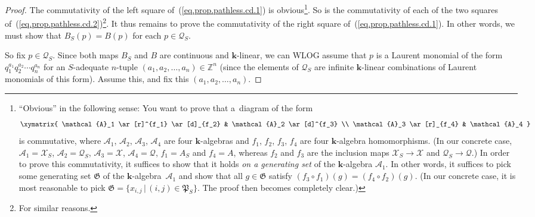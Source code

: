 \documentclass[pdftex]{sigma}
\numberwithin{equation}{section}
\begin{document}
\begin{proof}The commutativity of the left square of~(\ref{eq.prop.pathless.cd.1}) is obvious\footnote{``Obvious'' in the following sense: You want to prove that a~diagram of the form
\begin{gather*}
\xymatrix{
\mathcal{A}_1 \ar[r]^{f_1} \ar[d]_{f_2} & \mathcal{A}_2 \ar[d]^{f_3} \\
\mathcal{A}_3 \ar[r]_{f_4} & \mathcal{A}_4
}
\end{gather*}
is commutative, where $\mathcal{A}_{1}$, $\mathcal{A}_{2}$, $\mathcal{A}_{3}$, $\mathcal{A}_{4}$ are four $\mathbf{k}$-algebras and $f_{1}$, $f_{2}$, $f_{3}$, $f_{4}$ are four $\mathbf{k}$-algebra homomorphisms. (In our concrete case, $\mathcal{A}_{1}=\mathcal{X}_{S}$, $\mathcal{A}_{2}=\mathcal{Q}_{S}$, $\mathcal{A}_{3}=\mathcal{X}$, $\mathcal{A}_{4}=\mathcal{Q}$, $f_{1}=A_{S}$ and $f_{4}=A$, whereas $f_{2}$ and $f_{3}$ are the inclusion maps $\mathcal{X}_{S}\rightarrow\mathcal{X}$ and $\mathcal{Q}_{S}\rightarrow \mathcal{Q}$.) In order to prove this commutativity, it suffices to show that it holds \textit{on a generating set} of the $\mathbf{k}$-algebra
$\mathcal{A}_{1}$. In other words, it suffices to pick some generating set $\mathfrak{G}$ of the $\mathbf{k}$-algebra~$\mathcal{A}_{1}$ and show that all $g\in\mathfrak{G}$ satisfy $( f_{3}\circ f_{1}) ( g)= ( f_{4}\circ f_{2} ) ( g ) $. (In our concrete case, it is most reasonable to pick $\mathfrak{G}= \{ x_{i,j}\,|\, (i,j ) \in\mathfrak{P}_{S} \} $. The proof then becomes completely clear.)}. So is the commutativity of each of the two squares of~(\ref{eq.prop.pathless.cd.2})\footnote{For similar reasons.}. It thus remains to prove the commutativity of the right square of~(\ref{eq.prop.pathless.cd.1}). In other words, we must show that $B_{S}(p) =B(p) $ for each $p\in\mathcal{Q}_{S}$.

So fix $p\in\mathcal{Q}_{S}$. Since both maps $B_{S}$ and $B$ are continuous and $\mathbf{k}$-linear, we can WLOG assume that $p$ is a Laurent monomial of the form $q_{1}^{a_{1}}q_{2}^{a_{2}}\cdots q_{n}^{a_{n}}$ for an $S$-adequate $n$-tuple $( a_{1},a_{2},\ldots,a_{n}) \in\mathbb{Z}^{n}$ (since the elements of $\mathcal{Q}_{S}$ are infinite $\mathbf{k}$-linear combinations of Laurent monomials of this form). Assume this, and fix this
$ ( a_{1},a_{2},\ldots,a_{n} ) $.


\end{proof}
\end{document}
